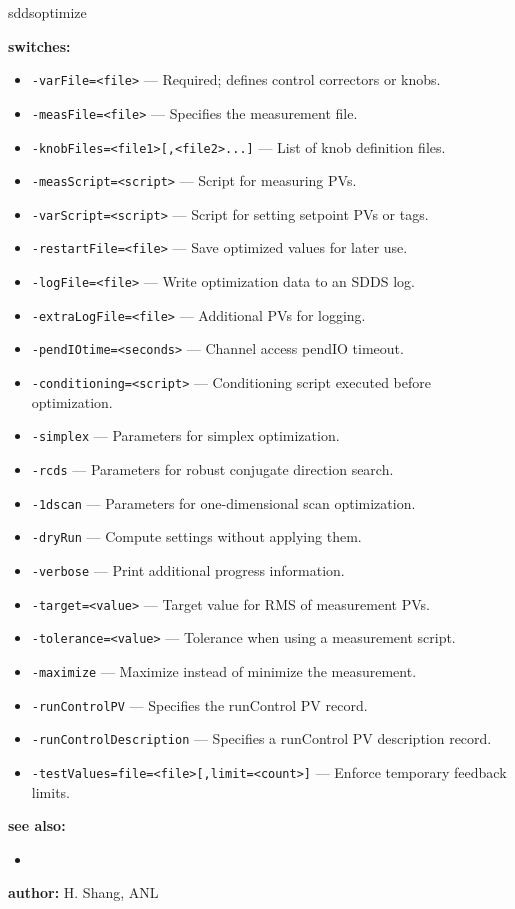\begin{sddsprog}{sddsoptimize}
\begin{itemize}
\end{itemize}

\item \textbf{switches:}
\begin{itemize}
  \item {\tt -varFile=<file>} --- Required; defines control correctors or knobs.
  \item {\tt -measFile=<file>} --- Specifies the measurement file.
  \item {\tt -knobFiles=<file1>[,<file2>...]} --- List of knob definition files.
  \item {\tt -measScript=<script>} --- Script for measuring PVs.
  \item {\tt -varScript=<script>} --- Script for setting setpoint PVs or tags.
  \item {\tt -restartFile=<file>} --- Save optimized values for later use.
  \item {\tt -logFile=<file>} --- Write optimization data to an SDDS log.
  \item {\tt -extraLogFile=<file>} --- Additional PVs for logging.
  \item {\tt -pendIOtime=<seconds>} --- Channel access pendIO timeout.
  \item {\tt -conditioning=<script>} --- Conditioning script executed before optimization.
  \item {\tt -simplex} --- Parameters for simplex optimization.
  \item {\tt -rcds} --- Parameters for robust conjugate direction search.
  \item {\tt -1dscan} --- Parameters for one-dimensional scan optimization.
  \item {\tt -dryRun} --- Compute settings without applying them.
  \item {\tt -verbose} --- Print additional progress information.
  \item {\tt -target=<value>} --- Target value for RMS of measurement PVs.
  \item {\tt -tolerance=<value>} --- Tolerance when using a measurement script.
  \item {\tt -maximize} --- Maximize instead of minimize the measurement.
  \item {\tt -runControlPV} --- Specifies the runControl PV record.
  \item {\tt -runControlDescription} --- Specifies a runControl PV description record.
  \item {\tt -testValues=file=<file>[,limit=<count>]} --- Enforce temporary feedback limits.
\end{itemize}
\item \textbf{see also:}
\begin{itemize}
  \item {}
\end{itemize}
\item \textbf{author:} H. Shang, ANL
\end{sddsprog}
